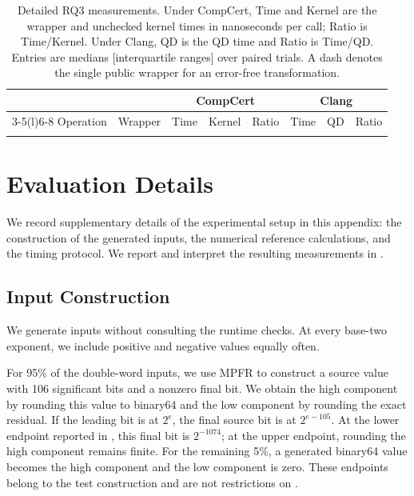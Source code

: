 \appendix
\begin{table}[t]
  \caption{Detailed RQ3 measurements. Under CompCert, Time and Kernel are the
  wrapper and unchecked kernel times in nanoseconds per call; Ratio is
  Time/Kernel. Under Clang, QD is the QD time and Ratio is Time/QD. Entries
  are medians [interquartile ranges] over paired trials. A dash denotes the
  single public wrapper for an error-free transformation.}
  \label{tab:rq3-performance-detail}
  \centering
  \setlength{\tabcolsep}{4pt}
  \begin{tabular}{@{}llrrrrrr@{}}
    \toprule
    & & \multicolumn{3}{c}{CompCert}
    & \multicolumn{3}{c}{Clang} \\
    \cmidrule(lr){3-5}\cmidrule(l){6-8}
    Operation & Wrapper
      & Time & Kernel & Ratio
      & Time & QD & Ratio \\
    \midrule
    \\
    \bottomrule
  \end{tabular}
\end{table}

\section{Evaluation Details}
\label{app:evaluation-details}

We record supplementary details of the experimental setup in this appendix:
the construction of the generated inputs, the numerical reference
calculations, and the timing protocol. We report and interpret the
resulting measurements in .

\subsection{Input Construction}

We generate inputs without consulting the runtime checks. At every base-two
exponent, we include positive and negative values equally often.

For 95\% of the double-word inputs, we use MPFR to construct a source value
with 106 significant bits and a nonzero final bit. We obtain the high
component by rounding this value to binary64 and the low component by rounding
the exact residual.
If the leading bit is at $2^e$, the final source bit is at $2^{e-105}$. At the
lower endpoint reported in , this final bit is
$2^{-1074}$; at the upper endpoint, rounding the high component remains finite.
For the remaining 5\%, a generated binary64 value becomes the high component
and the low component is zero. These endpoints belong to the test
construction and are not restrictions on \FenceDD{}.

